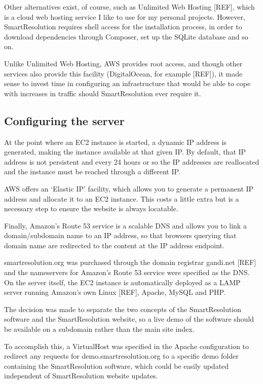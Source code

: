 Other alternatives exist, of course, such as Unlimited Web Hosting [REF], which is a cloud web hosting service I like to use for my personal projects. However, SmartResolution requires shell access for the installation process, in order to download dependencies through Composer, set up the SQLite database and so on.

Unlike Unlimited Web Hosting, AWS provides root access, and though other services also provide this facility (DigitalOcean, for example [REF]), it made sense to invest time in configuring an infrastructure that would be able to cope with increases in traffic should SmartResolution ever require it.

\subsection{Configuring the server}

At the point where an EC2 instance is started, a dynamic IP address is generated, making the instance available at that given IP. By default, that IP address is not persistent and every 24 hours or so the IP addresses are reallocated and the instance must be reached through a different IP.

AWS offers an `Elastic IP' facility, which allows you to generate a permanent IP address and allocate it to an EC2 instance. This costs a little extra but is a necessary step to ensure the website is always locatable.

Finally, Amazon's Route 53 service is a scalable DNS and allows you to link a domain/subdomain name to an IP address, so that browsers querying that domain name are redirected to the content at the IP address endpoint.

smartresolution.org was purchased through the domain registrar gandi.net [REF] and the nameservers for Amazon's Route 53 service were specified as the DNS. On the server itself, the EC2 instance is automatically deployed as a LAMP server running Amazon's own Linux [REF], Apache, MySQL and PHP.

The decision was made to separate the two concepts of the SmartResolution software and the SmartResolution website, so a live demo of the software should be available on a subdomain rather than the main site index.

To accomplish this, a VirtualHost was specified in the Apache configuration to redirect any requests for demo.smartresolution.org to a specific demo folder containing the SmartResolution software, which could be easily updated independent of SmartResolution website updates.

